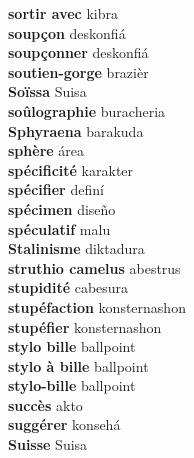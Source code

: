 \textbf{ sortir avec  } kibra \\
\textbf{ soupçon  } deskonfiá \\
\textbf{ soupçonner  } deskonfiá \\
\textbf{ soutien-gorge  } brazièr \\
\textbf{ Soïssa  } Suisa \\
\textbf{ soûlographie  } buracheria \\
\textbf{ Sphyraena  } barakuda \\
\textbf{ sphère  } área \\
\textbf{ spécificité  } karakter \\
\textbf{ spécifier  } definí \\
\textbf{ spécimen  } diseño \\
\textbf{ spéculatif  } malu \\
\textbf{ Stalinisme  } diktadura \\
\textbf{ struthio camelus  } abestrus \\
\textbf{ stupidité  } cabesura \\
\textbf{ stupéfaction  } konsternashon \\
\textbf{ stupéfier  } konsternashon \\
\textbf{ stylo bille  } ballpoint \\
\textbf{ stylo à bille  } ballpoint \\
\textbf{ stylo-bille  } ballpoint \\
\textbf{ succès  } akto \\
\textbf{ suggérer  } konsehá \\
\textbf{ Suisse  } Suisa \\
